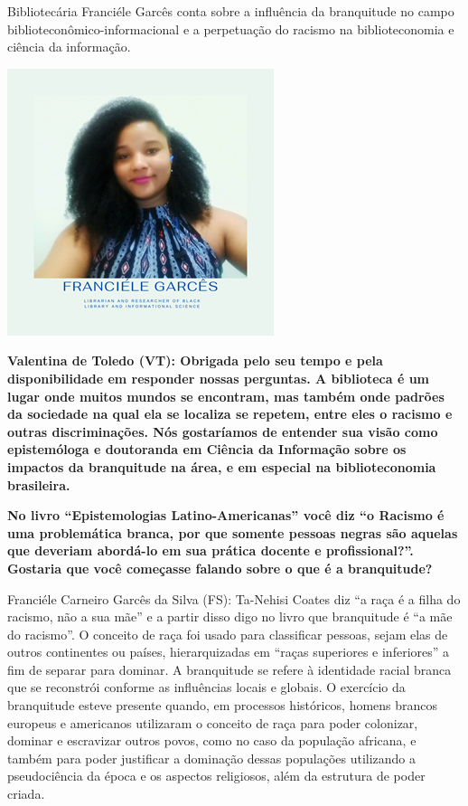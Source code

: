 \documentclass[a4paper,
fontsize=11pt,
oneside,
numbers=noperiodatend,
parskip=half-,
bibliography=totoc,
final
]{scrartcl}
\begin{document}
Bibliotecária Franciéle Garcês conta sobre a influência
da branquitude no campo biblioteconômico-informacional e a perpetuação
do racismo na biblioteconomia e ciência da
informação.

\begin{center}
\includegraphics{img/img2.PNG}
\end{center}

\textbf{Valentina de Toledo (VT): Obrigada pelo seu tempo e pela
disponibilidade em responder nossas perguntas. A biblioteca é um lugar
onde muitos mundos se encontram, mas também onde padrões da sociedade na
qual ela se localiza se repetem, entre eles o racismo e outras
discriminações. Nós gostaríamos de entender sua visão como epistemóloga
e doutoranda em Ciência da Informação sobre os impactos da branquitude
na área, e em especial na biblioteconomia brasileira.}

\textbf{No livro \enquote{Epistemologias Latino-Americanas} você diz
\enquote{o Racismo é uma problemática branca, por que somente pessoas
negras são aquelas que deveriam abordá-lo em sua prática docente e
profissional?}. Gostaria que você começasse falando sobre o que é a
branquitude?}

Franciéle Carneiro Garcês da Silva (FS): Ta-Nehisi Coates diz \enquote{a
raça é a filha do racismo, não a sua mãe} e a partir disso digo no livro
que branquitude é \enquote{a mãe do racismo}. O conceito de raça foi
usado para classificar pessoas, sejam elas de outros continentes ou
países, hierarquizadas em \enquote{raças superiores e inferiores} a fim
de separar para dominar. A branquitude se refere à identidade racial
branca que se reconstrói conforme as influências locais e globais. O
exercício da branquitude esteve presente quando, em processos
históricos, homens brancos europeus e americanos utilizaram o conceito
de raça para poder colonizar, dominar e escravizar outros povos, como no
caso da população africana, e também para poder justificar a dominação
dessas populações utilizando a pseudociência da época e os aspectos
religiosos, além da estrutura de poder criada.
\end{document}
